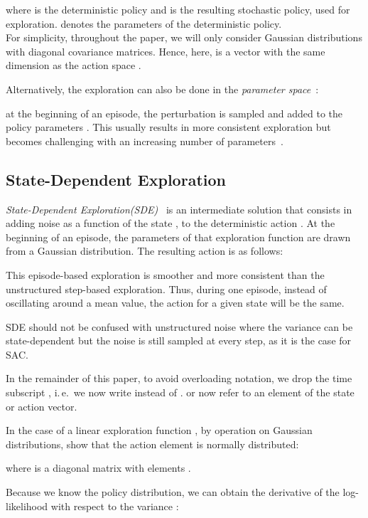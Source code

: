 \documentclass{article}
\newcommand{\ie}{i.\,e.\ }
\newcommand{\sde}{State-Dependent Exploration\xspace}
\newcommand{\SDE}{\textsc{SDE}\xspace}
\newcommand{\sac}{\textsc{SAC}\xspace}
\begin{document}
where  is the deterministic policy and  is the resulting stochastic policy, used for exploration.  denotes the parameters of the deterministic policy.\\
For simplicity, throughout the paper, we will only consider Gaussian distributions with diagonal covariance matrices. Hence, here,  is a vector with the same dimension as the action space .

Alternatively, the exploration can also be done in the \textit{parameter space}~\citep{ruckstiess2010exploring, plappert2017parameter, pourchot2018cem}:

at the beginning of an episode, the perturbation  is sampled and added to the policy parameters .
This usually results in more consistent exploration but becomes challenging with an increasing number of parameters~\citep{plappert2017parameter}.



\subsection{State-Dependent Exploration}
\label{sec:sde}

\textit{\sde(\SDE)}~\citep{ruckstiess2008state, ruckstiess2010exploring} is an intermediate solution that consists in adding noise as a function of the state , to the deterministic action . At the beginning of an episode, the parameters  of that exploration function are drawn from a Gaussian distribution. The resulting action  is as follows:

This episode-based exploration is smoother and more consistent than the unstructured step-based exploration. Thus, during one episode, instead of oscillating around a mean value, the action  for a given state  will be the same.

\SDE should not be confused with unstructured noise where the variance can be state-dependent but the noise is still sampled at every step, as it is the case for \sac.

In the remainder of this paper, to avoid overloading notation, we drop the time subscript , \ie we now write  instead of .  or  now refer to an element of the state or action vector.

In the case of a linear exploration function , by operation on Gaussian distributions, \citet{ruckstiess2008state} show that the action element  is normally distributed:

where  is a diagonal matrix with elements .

Because we know the policy distribution, we can obtain the derivative of the log-likelihood  with respect to the variance :
\end{document}

